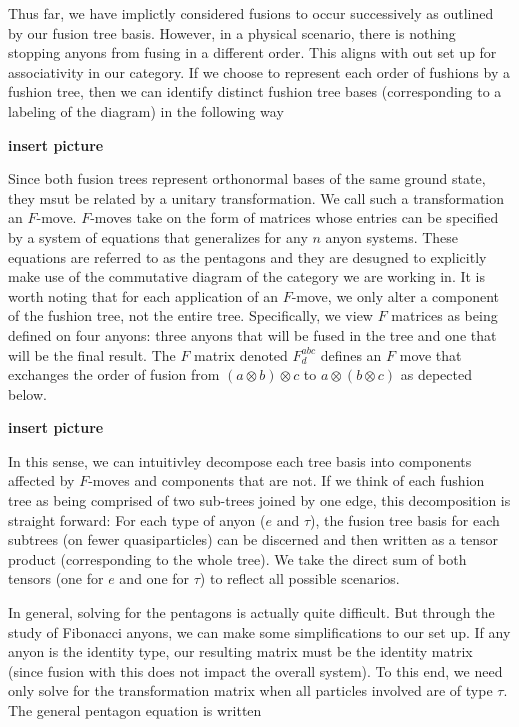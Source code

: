 \documentclass[10pt]{ucthesis}
\begin{document}
Thus far, we have implictly considered fusions to occur successively as outlined by our fusion tree basis. However, in a physical scenario, there is nothing stopping anyons from fusing in a different order. This aligns with out set up for associativity in our category. If we choose to represent each order of fushions by a fushion tree, then we can identify distinct fushion tree bases (corresponding to a labeling of the diagram) in the following way

\textbf{insert picture}

Since both fusion trees represent orthonormal bases of the same ground state, they msut be related by a unitary transformation. We call such a transformation an $F$-move. $F$-moves take on the form of matrices whose entries can be specified by a system of equations that generalizes for any $n$ anyon systems. These equations are referred to as the pentagons and they are desugned to explicitly make use of the commutative diagram of the category we are working in. It is worth noting that for each application of an $F$-move, we only alter a component of the fushion tree, not the entire tree. Specifically, we view $F$ matrices as being defined on four anyons: three anyons that will be fused in the tree and one that will be the final result. The $F$ matrix denoted $F^{abc}_d$ defines an $F$ move that exchanges the order of fusion from $(a\otimes b)\otimes c$ to $a\otimes(b\otimes c)$ as depected below.

\textbf{insert picture}

In this sense, we can intuitivley decompose each tree basis into components affected by $F$-moves and components that are not. If we think of each fushion tree as being comprised of two sub-trees joined by one edge, this decomposition is straight forward: For each type of anyon ($e$ and $\tau$), the fusion tree basis for each subtrees (on fewer quasiparticles) can be discerned and then written as a tensor product (corresponding to the whole tree). We take the direct sum of both tensors (one for $e$ and one for $\tau$) to reflect all possible scenarios.

In general, solving for the pentagons is actually quite difficult. But through the study of Fibonacci anyons, we can make some simplifications to our set up. If any anyon is the identity type, our resulting matrix must be the identity matrix (since fusion with this does not impact the overall system). To this end, we need only solve for the transformation matrix when all particles involved are of type $\tau$. The general pentagon equation is written
\end{document}
